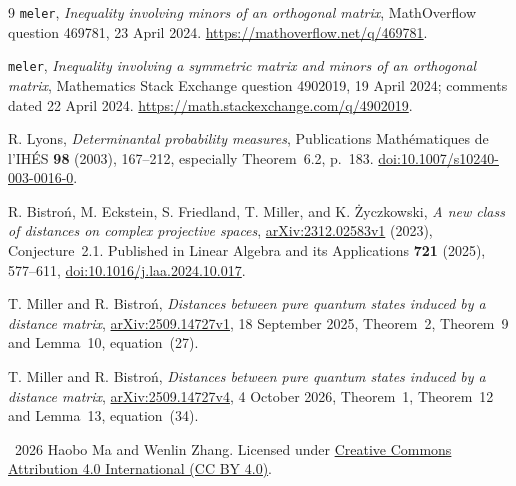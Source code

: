 \documentclass[11pt]{article}
\begin{document}
\begin{thebibliography}{9}
\small
{}
\texttt{meler}, \emph{Inequality involving minors of an orthogonal matrix},
MathOverflow question 469781, 23 April 2024.
\url{https://mathoverflow.net/q/469781}.

\texttt{meler}, \emph{Inequality involving a symmetric matrix and minors of
an orthogonal matrix}, Mathematics Stack Exchange question 4902019,
19 April 2024; comments dated 22 April 2024.
\url{https://math.stackexchange.com/q/4902019}.

R. Lyons, \emph{Determinantal probability measures},
Publications Math\'ematiques de l'IH\'ES \textbf{98} (2003), 167--212,
especially Theorem~6.2, p.~183.
\href{https://doi.org/10.1007/s10240-003-0016-0}{doi:10.1007/s10240-003-0016-0}.

R. Bistro\'n, M. Eckstein, S. Friedland, T. Miller, and K. \.Zyczkowski,
\emph{A new class of distances on complex projective spaces},
\href{https://arxiv.org/abs/2312.02583v1}{arXiv:2312.02583v1} (2023),
Conjecture~2.1. Published in Linear Algebra and its Applications
\textbf{721} (2025), 577--611,
\href{https://doi.org/10.1016/j.laa.2024.10.017}{doi:10.1016/j.laa.2024.10.017}.

T. Miller and R. Bistro\'n,
\emph{Distances between pure quantum states induced by a distance matrix},
\href{https://arxiv.org/abs/2509.14727v1}{arXiv:2509.14727v1},
18 September 2025, Theorem~2, Theorem~9 and Lemma~10, equation~(27).

T. Miller and R. Bistro\'n,
\emph{Distances between pure quantum states induced by a distance matrix},
\href{https://arxiv.org/abs/2509.14727v4}{arXiv:2509.14727v4},
4 October 2026, Theorem~1, Theorem~12 and Lemma~13, equation~(34).
\end{thebibliography}

\bigskip\noindent\small
\textcopyright\ 2026 Haobo Ma and Wenlin Zhang.
Licensed under \href{https://creativecommons.org/licenses/by/4.0/}{Creative Commons Attribution 4.0 International (CC BY 4.0)}.
\end{document}
